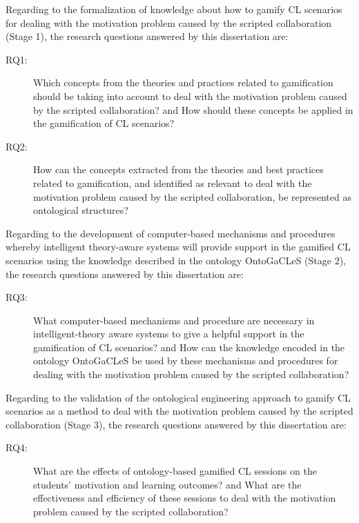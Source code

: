 Regarding to the formalization of knowledge about how to gamify CL scenarios for dealing with the motivation problem caused by the scripted collaboration (Stage 1), the research questions answered by this dissertation are:

\begin{description}
\item[RQ1:]
Which concepts from the theories and practices related to gamification should be taking into account to deal with the motivation problem caused by the scripted collaboration? and How should these concepts be applied in the gamification of CL scenarios?

\item[RQ2:]
How can the concepts extracted from the theories and best practices related to gamification, and identified as relevant to deal with the motivation problem caused by the scripted collaboration, be represented as ontological structures?
\end{description}

Regarding to the development of computer-based mechanisms and procedures whereby intelligent theory-aware systems will provide support in the gamified CL scenarios using the knowledge described in the ontology OntoGaCLeS (Stage 2), the research questions answered by this dissertation are:

\begin{description}
\item[RQ3:]
What computer-based mechanisms and procedure are necessary in intelligent-theory aware systems to give a helpful support in the gamification of CL scenarios? and How can the knowledge encoded in the ontology OntoGaCLeS be used by these mechanisms and procedures for dealing with the motivation problem caused by the scripted collaboration?
\end{description}

Regarding to the validation of the ontological engineering approach to gamify CL scenarios as a method to deal with the motivation problem caused by the scripted collaboration (Stage 3), the research questions answered by this dissertation are:

\begin{description}
\item[RQ4:]
What are the effects of ontology-based gamified CL sessions on the students’ motivation and learning outcomes? and What are the effectiveness and efficiency of these sessions to deal with the motivation problem caused by the scripted collaboration?
\end{description}

